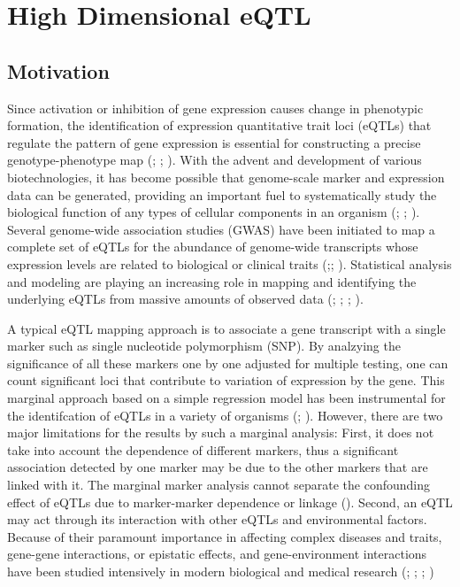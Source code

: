 \documentclass[]{book}
\theoremstyle{definition}
\theoremstyle{definition}
\theoremstyle{remark}
\begin{document}
\chapter{High Dimensional eQTL}\label{high-dimensional-eqtl}

\section{Motivation}\label{motivation}

Since activation or inhibition of gene expression causes change in
phenotypic formation, the identification of expression quantitative
trait loci (eQTLs) that regulate the pattern of gene expression is
essential for constructing a precise genotype-phenotype map
(\cite{emilsson2008genetics}; \cite{cookson2009mapping};
\cite{nica2013expression}). With the advent and development of various
biotechnologies, it has become possible that genome-scale marker and
expression data can be generated, providing an important fuel to
systematically study the biological function of any types of cellular
components in an organism (\cite{kim2014meta}; \cite{fairfax2014innate};
\cite{lee2014common}). Several genome-wide association studies (GWAS)
have been initiated to map a complete set of eQTLs for the abundance of
genome-wide transcripts whose expression levels are related to
biological or clinical traits
(\cite{nica2013expression};\cite{li2013using};
\cite{koopmann2014genome}). Statistical analysis and modeling are
playing an increasing role in mapping and identifying the underlying
eQTLs from massive amounts of observed data
(\cite{kendziorski2006statistical}; \cite{chun2009expression};
\cite{sun2012statistical}; \cite{flutre2013statistical}).

A typical eQTL mapping approach is to associate a gene transcript with a
single marker such as single nucleotide polymorphism (SNP). By analzying
the significance of all these markers one by one adjusted for multiple
testing, one can count significant loci that contribute to variation of
expression by the gene. This marginal approach based on a simple
regression model has been instrumental for the identifcation of eQTLs in
a variety of organisms (\cite{rockman2010selection};
\cite{kim2014meta}). However, there are two major limitations for the
results by such a marginal analysis: First, it does not take into
account the dependence of different markers, thus a significant
association detected by one marker may be due to the other markers that
are linked with it. The marginal marker analysis cannot separate the
confounding effect of eQTLs due to marker-marker dependence or linkage
(\cite{wu2007statistical}). Second, an eQTL may act through its
interaction with other eQTLs and environmental factors. Because of their
paramount importance in affecting complex diseases and traits, gene-gene
interactions, or epistatic effects, and gene-environment interactions
have been studied intensively in modern biological and medical research
(\cite{cheverud1995epistasis}; \cite{moore2003ubiquitous};
\cite{van2010detection}; \cite{mackay2014epistasis})
\end{document}
